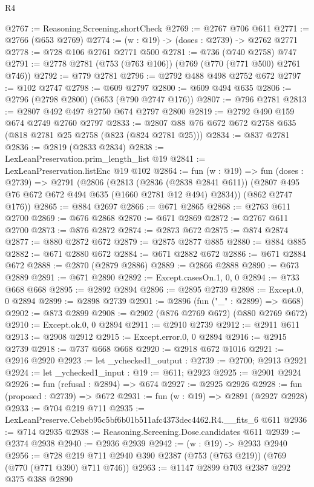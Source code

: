\begin{lexlean}{R4}
\begin{coremodule}
@2767 := Reasoning.Screening.shortCheck
@2769 := @2767 @706 @611
@2771 := @2766 (@653 @2769)
@2774 := (w : @19) -> (doses : @2739) -> @2762 @2771
@2778 := @728 @106 @2761 @2771 @500
@2781 := @736 (@740 @2758) @747
@2791 := @2778 @2781 (@753 (@763 @106)) (@769 (@770 (@771 @500) @2761 @746))
@2792 := @779 @2781
@2796 := @2792 @488 @498 @2752 @672
@2797 := @102 @2747
@2798 := @609 @2797
@2800 := @609 @494 @635
@2806 := @2796 (@2798 @2800) (@653 (@790 @2747 @176))
@2807 := @796 @2781
@2813 := @2807 @492 @497 @2750 @674 @2797 @2800
@2819 := @2792 @490 @159 @674 @2749 @2760 @2797
@2833 := @2807 @88 @76 @672 @672 @2758 @635 (@818 @2781 @25 @2758 (@823 (@824 @2781 @25)))
@2834 := @837 @2781
@2836 := @2819 (@2833 @2834)
@2838 := LexLeanPreservation.prim_length_list @19
@2841 := LexLeanPreservation.listEnc @19 @102
@2864 := fun (w : @19) =>
  fun (doses : @2739) =>
  @2791
    (@2806
      (@2813
        (@2836 (@2838 @2841 @611))
        (@2807 @495 @76 @672 @672 @494 @635 (@1660 @2781 @12 @494) @2834))
      (@862 @2747 @176))
@2865 := @884 @2697
@2866 := @671 @2865
@2868 := @2763 @611 @2700
@2869 := @676 @2868
@2870 := @671 @2869
@2872 := @2767 @611 @2700
@2873 := @876 @2872
@2874 := @2873 @672
@2875 := @874 @2874
@2877 := @880 @2872 @672
@2879 := @2875 @2877 @885
@2880 := @884 @885
@2882 := @671 @2880 @672
@2884 := @671 @2882 @672
@2886 := @671 @2884 @672
@2888 := @2870 (@2879 @2886)
@2889 := @2866 @2888
@2890 := @673 @2889
@2891 := @671 @2890
@2892 := Except.casesOn.{1, 0, 0}
@2894 := @733 @668 @668
@2895 := @2892 @2894
@2896 := @2895 @2739
@2898 := Except.{0, 0} @2894
@2899 := @2898 @2739
@2901 := @2896 (fun ("_" : @2899) => @668)
@2902 := @873 @2899
@2908 := @2902 (@876 @2769 @672) (@880 @2769 @672)
@2910 := Except.ok.{0, 0} @2894
@2911 := @2910 @2739
@2912 := @2911 @611
@2913 := @2908 @2912
@2915 := Except.error.{0, 0} @2894
@2916 := @2915 @2739
@2918 := @737 @668 @668
@2920 := @2918 @672 @1016
@2921 := @2916 @2920
@2923 := let _ychecked1_output : @2739 := @2700; @2913 @2921
@2924 := let _ychecked1_input : @19 := @611; @2923
@2925 := @2901 @2924
@2926 := fun (refusal : @2894) => @674
@2927 := @2925 @2926
@2928 := fun (proposed : @2739) => @672
@2931 := fun (w : @19) => @2891 (@2927 @2928)
@2933 := @704 @219 @711
@2935 := LexLeanPreserve.Cebeb95c5bf6b01b511afc4373dec4462.R4.__fits_6 @611
@2936 := @714 @2935
@2938 := Reasoning.Screening.Dose.candidates @611
@2939 := @2374 @2938
@2940 := @2936 @2939
@2942 := (w : @19) -> @2933 @2940
@2956 := @728 @219 @711 @2940 @390 @2387 (@753 (@763 @219)) (@769 (@770 (@771 @390) @711 @746))
@2963 := @1147 @2899 @703 @2387 @292 @375 @388 @2890

\end{coremodule}
\end{lexlean}
